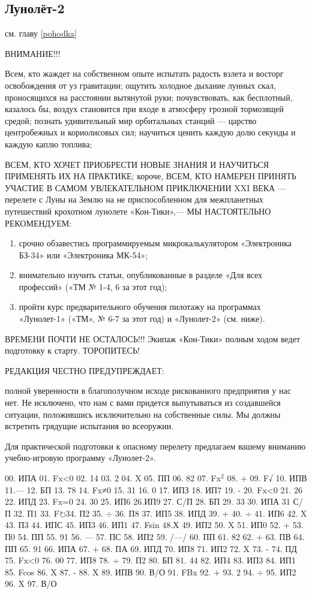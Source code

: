 \documentclass[11pt,a4paper,oneside]{article}
\def\FO{F$\circlearrowright$}
\begin{document}
\subsection{Лунолёт-2}
см. главу \ref{pohodka}

ВНИМАНИЕ!!!

Всем, кто жаждет на собственном опыте испытать радость взлета и восторг освобождения от уз гравитации;
ощутить холодное дыхание лунных скал, проносящихся на расстоянии вытянутой руки;
почувствовать, как бесплотный, казалось бы, воздух становится при входе в атмосферу грозной тормозящей средой;
познать удивительный мир орбитальных станций — царство центробежных и кориолисовых сил;
научиться ценить каждую долю секунды и каждую каплю топлива;

ВСЕМ, КТО ХОЧЕТ ПРИОБРЕСТИ НОВЫЕ ЗНАНИЯ И НАУЧИТЬСЯ ПРИМЕНЯТЬ ИХ НА ПРАКТИКЕ;
короче, ВСЕМ, КТО НАМЕРЕН ПРИНЯТЬ УЧАСТИЕ В САМОМ УВЛЕКАТЕЛЬНОМ ПРИКЛЮЧЕНИИ XXI ВЕКА — перелете с Луны на Землю на не приспособленном для межпланетных путешествий крохотном лунолете «Кон-Тики»,— МЫ НАСТОЯТЕЛЬНО РЕКОМЕНДУЕМ:

\begin{enumerate}
\item	срочно обзавестись программируемым микрокалькулятором «Электроника БЗ-34» или «Электроника МК-54»;
\item	внимательно изучить статьи, опубликованные в разделе «Для всех профессий» («ТМ № 1-4, 6 за этот год);
\item	пройти курс предварительного обучения пилотажу на программах «Лунолет-1» («ТМ», № 6-7 за этот год) и «Лунолет-2» (см. ниже).
\end{enumerate}

ВРЕМЕНИ ПОЧТИ НЕ ОСТАЛОСЬ!!! Экипаж «Кон-Тики» полным ходом ведет подготовку к старту. ТОРОПИТЕСЬ!

РЕДАКЦИЯ ЧЕСТНО ПРЕДУПРЕЖДАЕТ:

полной уверенности в благополучном исходе рискованного предприятия у нас нет. Не исключено, что нам с вами придется выпутываться из создавшейся ситуации, положившись исключительно на собственные силы. Мы должны встретить грядущие испытания во всеоружии.

Для практической подготовки к опасному перелету предлагаем вашему вниманию учебно-игровую программу «Лунолет-2».

00. ИПА 01. Fx<0 02. 14 03. 2 04. X 05. ПП 06. 82 07. Fx$^{2}$ 08. + 09. F√ 10. ИПВ 11.— 12. БП 13. 78 14. Fx≠0 15. 31 16. 0 17. ИПЗ 18. ИП7 19. - 20.  Fx<0 21. 26 22. ИПД 23. Fx=0 24. 30 25. ИП6 26.ИП9 27. С/П 28. БП 29. 33 30. ИПА 31 С/П 32. П1 33. \FO 34. П2 35. $\div$ 36. П8 37. ИП5 38. ИПД 39. + 40. ÷ 41. ИП6 42. X 43. П3 44. ИПС 45. ИП3 46. ИП1 47. Fsin 48.Х 49. ИП2 50. X 51. ИП0 52. + 53. П0 54. ПП 55. 91 56. — 57. ПС 58. ИП2 59. /—/ 60. ПП 61. 82 62. + 63. ПВ 64. ПП 65. 91 66. ИПА 67. + 68. ПА 69. ИПД 70. ИП8 71. ИП2 72. X 73. - 74. ПД 75. Fx<0 76. 00 77. ИП8 78. ÷ 79. П2 80. БП 81. 44 82. ИП4 83. ИП3 84. ИП1 85. Fcos 86. X 87. - 88. X 89. ИПВ 90. В/О 91. FBx 92. + 93. 2 94. $\div$ 95. ИП2 96. X 97. В/О
\end{document}
